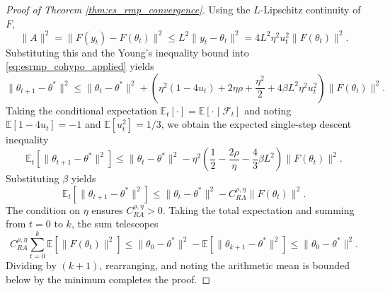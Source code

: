 \documentclass[letter,11pt]{article}
\begin{document}
\begin{proof}[Proof of Theorem \ref{thm:es_rmp_convergence}]
Using the $L$-Lipschitz continuity of $F$,
\begin{equation}
\|A\|^2 = \|F(y_t) - F(\theta_t)\|^2 \le L^2\|y_t - \theta_t\|^2 = 4L^2 \eta^2 u_t^2 \|F(\theta_t)\|^2.
\end{equation}
Substituting this and the Young's inequality bound into \eqref{eq:esrmp_cohypo_applied} yields
\begin{equation}
\|\theta_{t+1} - \theta^*\|^2 \le \|\theta_t - \theta^*\|^2 + \left( \eta^2(1 - 4u_t) + 2\eta\rho + \frac{\eta^2}{2} + 4\beta L^2 \eta^2 u_t^2 \right) \|F(\theta_t)\|^2.
\end{equation}
Taking the conditional expectation $\mathbb{E}_t[\cdot] = \mathbb{E}[\cdot \mid \mathcal{F}_t]$ and noting $\mathbb{E}[1 - 4u_t] = -1$ and $\mathbb{E}[u_t^2] = 1/3$, we obtain the expected single-step descent inequality
\begin{equation}
\mathbb{E}_t\left[\|\theta_{t+1} - \theta^*\|^2\right] \le \|\theta_t - \theta^*\|^2 - \eta^2 \left( \frac{1}{2} - \frac{2\rho}{\eta} - \frac{4}{3}\beta L^2 \right) \|F(\theta_t)\|^2.
\end{equation}
Substituting $\beta$ yields
\begin{equation}
\mathbb{E}_t\left[\|\theta_{t+1} - \theta^*\|^2\right] \le \|\theta_t - \theta^*\|^2 - C_{RA}^{\rho,\eta} \|F(\theta_t)\|^2.
\end{equation}
The condition on $\eta$ ensures $C_{RA}^{\rho,\eta} > 0$. Taking the total expectation and summing from $t = 0$ to $k$, the sum telescopes
\begin{equation}
C_{RA}^{\rho,\eta} \sum_{t=0}^k \mathbb{E}\left[\|F(\theta_t)\|^2\right] \le \|\theta_0 - \theta^*\|^2 - \mathbb{E}\left[\|\theta_{k+1} - \theta^*\|^2\right] \le \|\theta_0 - \theta^*\|^2.
\end{equation}
Dividing by $(k+1)$, rearranging, and noting the arithmetic mean is bounded below by the minimum completes the proof.
\end{proof}
\end{document}
